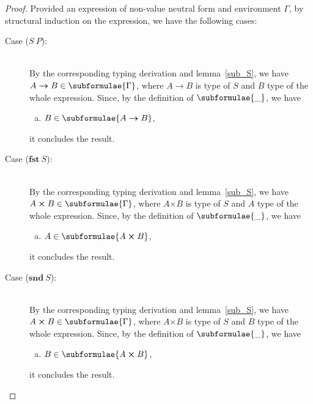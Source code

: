 \documentclass[a4paper]{article}
\newcommand{\typarr}[2]{#1\boldsymbol{\rightarrow}#2}
\newcommand{\typprd}[2]{#1\boldsymbol{\times}#2}
\newcommand{\expapp}[2]{#1\ #2}
\newcommand{\expfst}[1]{\mathbf{fst}\ #1}
\newcommand{\expsnd}[1]{\mathbf{snd}\ #1}
\begin{document}
\begin{proof}
Provided an expression of non-value neutral form and environment
$\Gamma$, by structural induction on the expression, we have the following cases:
\begin{description}
\item[Case ($\expapp{S}{P}$):]\ \\ 
  By the corresponding typing derivation and lemma~\ref{sub_S}, we
  have $\typarr{A}{B} \in \subformulae{\Gamma}$, where $\typarr{A}{B}$
  is type of $S$ and $B$ type of the whole expression. Since, by the
  definition of $\subformulae{\_}$, we have
  \begin{enumerate}[(a)] 
  \item  $B \in \subformulae{\typarr{A}{B}}$,
  \end{enumerate}
  it concludes the result.
\item[Case ($\expfst{S}$):]\ \\
  By the corresponding typing derivation and lemma~\ref{sub_S}, we
  have $\typprd{A}{B} \in \subformulae{\Gamma}$, where $\typprd{A}{B}$
  is type of $S$ and $A$ type of the whole expression. Since, by the
  definition of $\subformulae{\_}$, we have
  \begin{enumerate}[(a)] 
  \item $A \in \subformulae{\typprd{A}{B}}$,
  \end{enumerate}
  it concludes the result.
\item[Case ($\expsnd{S}$):]\ \\
  By the corresponding typing derivation and lemma~\ref{sub_S}, we
  have $\typprd{A}{B} \in \subformulae{\Gamma}$, where $\typprd{A}{B}$
  is type of $S$ and $B$ type of the whole expression. Since, by the
  definition of $\subformulae{\_}$, we have
  \begin{enumerate}[(a)] 
  \item $B \in \subformulae{\typprd{A}{B}}$,
  \end{enumerate}
  it concludes the result.
\end{description}
\end{proof}
\end{document}
